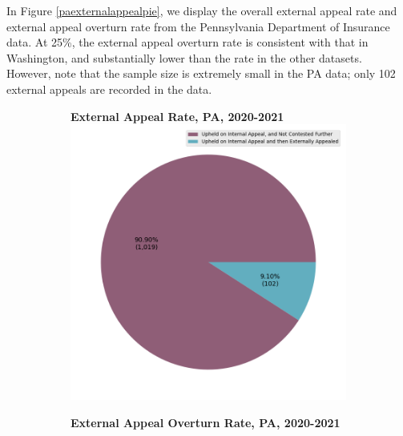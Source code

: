 \documentclass[12pt, a4paper,twoside]{report}
\theoremstyle{plain} %
\theoremstyle{definition} %
\theoremstyle{remark} %
\numberwithin{equation}{chapter}
\begin{document}
		In Figure \ref{paexternalappealpie}, we display the overall external appeal rate and external appeal overturn rate from the Pennsylvania Department of Insurance data. At 25\%, the external appeal overturn rate is consistent with that in Washington, and substantially lower than the rate in the other datasets. However, note that the sample size is extremely small in the PA data; only 102 external appeals are recorded in the data.
		
		\begin{figure}[h!]
			\centering
			\begin{subfigure}[b]{0.49\textwidth}
				\centering
				\textbf{External Appeal Rate, PA, 2020-2021}
				\includegraphics[width=\textwidth]{images/pa_claims/overall_external_appeal_rate_pie.png}
			\end{subfigure}
			\hfill
			\begin{subfigure}[b]{0.49\textwidth}
				\centering
				\textbf{External Appeal Overturn Rate, PA, 2020-2021}

\end{subfigure}
\end{figure}
\end{document}
